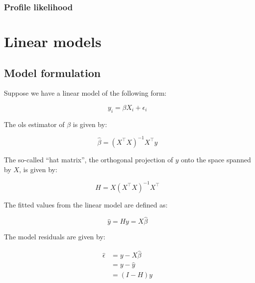 \documentclass{report}
\begin{document}
\subsubsection{Profile likelihood}

\section{Linear models}\label{sec:tools-ols}

\subsection{Model formulation}

Suppose we have a linear model of the following form:

\begin{equation}\label{eq:ols-model}
    y_i = \beta X_i + \epsilon_i
\end{equation}

The \gls{ols} estimator of $\beta$ is given by:

\begin{equation}\label{eq:ols-beta-est}
    \hat{\beta} = (X^\intercal X)^{-1}X^\intercal y
\end{equation}

The so-called ``hat matrix'', the orthogonal projection of $y$ onto the space spanned by $X$, is given by:

\begin{equation}\label{eq:ols-hat-matrix}
    H = X(X^\intercal X)^{-1} X^\intercal
\end{equation}

The fitted values from the linear model are defined as: 

\begin{equation}\label{eq:ols-fitted-vals}
    \hat{y} = Hy = X\hat{\beta}
\end{equation}

The model residuals are given by:

\begin{equation}\label{eq:ols-residuals}
    \begin{aligned}
        \hat{\epsilon}
          &= y - X\hat{\beta} \\
          &= y - \hat{y} \\
          &= (I - H)y \\
    \end{aligned}
\end{equation}
\end{document}

